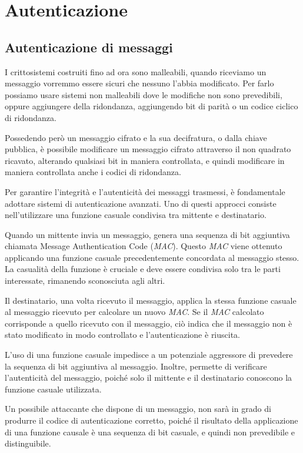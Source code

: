 \chapter{Autenticazione}
\section{Autenticazione di messaggi}
I crittosistemi costruiti fino ad ora sono malleabili, quando riceviamo un messaggio vorremmo
essere sicuri che nessuno l'abbia modificato. Per farlo possiamo usare sistemi non malleabili
dove le modifiche non sono prevedibili, oppure aggiungere della ridondanza, aggiungendo
bit di parità o un codice ciclico di ridondanza.

Possedendo però un messaggio cifrato e la sua decifratura, o dalla chiave pubblica,
è possibile modificare un messaggio 
cifrato attraverso il non quadrato ricavato, alterando qualsiasi bit in maniera controllata, e 
quindi modificare in maniera controllata anche i codici di ridondanza.

Per garantire l'integrità e l'autenticità dei messaggi trasmessi, è fondamentale adottare sistemi di autenticazione avanzati. Uno di questi approcci consiste nell'utilizzare una funzione casuale condivisa tra mittente e destinatario.

Quando un mittente invia un messaggio, genera una sequenza di bit aggiuntiva chiamata
Message Authentication Code (\textit{MAC}). Questo \textit{MAC} viene ottenuto applicando una
funzione casuale precedentemente concordata al messaggio stesso. La casualità della
funzione è cruciale e deve essere condivisa solo tra le parti interessate, rimanendo
sconosciuta agli altri.

Il destinatario, una volta ricevuto il messaggio, applica la stessa funzione casuale
al messaggio ricevuto per calcolare un nuovo \textit{MAC}. Se il \textit{MAC} calcolato corrisponde a
quello ricevuto con il messaggio, ciò indica che il messaggio non è stato modificato
in modo controllato e l'autenticazione è riuscita.

L'uso di una funzione casuale impedisce a un potenziale aggressore di prevedere la
sequenza di bit aggiuntiva al messaggio. Inoltre, permette di verificare l'autenticità
del messaggio, poiché solo il mittente e il destinatario conoscono la funzione casuale
utilizzata.

Un possibile attaccante che dispone di un messaggio, non sarà in grado di produrre 
il codice di autenticazione corretto, poiché il risultato della applicazione di una funzione 
causale è una sequenza di bit casuale, e quindi non prevedibile e distinguibile.


